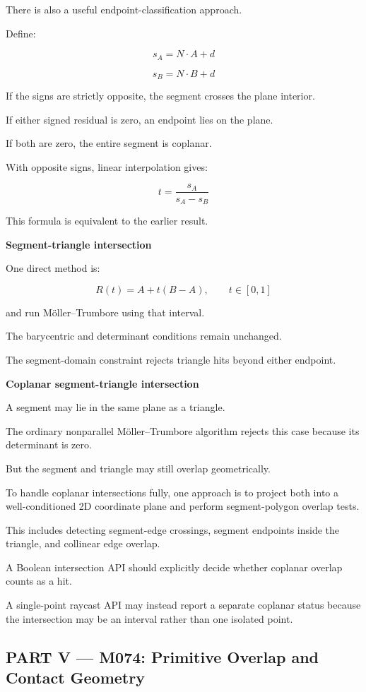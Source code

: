 There is also a useful endpoint-classification approach.

Define:

\[
s_A=N\cdot A+d
\]

\[
s_B=N\cdot B+d
\]

If the signs are strictly opposite, the segment crosses the plane interior.

If either signed residual is zero, an endpoint lies on the plane.

If both are zero, the entire segment is coplanar.

With opposite signs, linear interpolation gives:

\[
\boxed{ t=\frac{s_A}{s_A-s_B} }
\]

This formula is equivalent to the earlier result.

\textbf{Segment-triangle intersection}

One direct method is:

\[
R(t)=A+t(B-A),\qquad t\in[0,1]
\]

and run Möller--Trumbore using that interval.

The barycentric and determinant conditions remain unchanged.

The segment-domain constraint rejects triangle hits beyond either endpoint.

\textbf{Coplanar segment-triangle intersection}

A segment may lie in the same plane as a triangle.

The ordinary nonparallel Möller--Trumbore algorithm rejects this case because its determinant is zero.

But the segment and triangle may still overlap geometrically.

To handle coplanar intersections fully, one approach is to project both into a well-conditioned 2D coordinate plane and perform segment-polygon overlap tests.

This includes detecting segment-edge crossings, segment endpoints inside the triangle, and collinear edge overlap.

A Boolean intersection API should explicitly decide whether coplanar overlap counts as a hit.

A single-point raycast API may instead report a separate coplanar status because the intersection may be an interval rather than one isolated point.

\subsection{PART V --- M074: Primitive Overlap and Contact Geometry}\label{04-visual-computing-ii-ch024-part-v-m074-primitive-overlap-and-contact-geometry}

